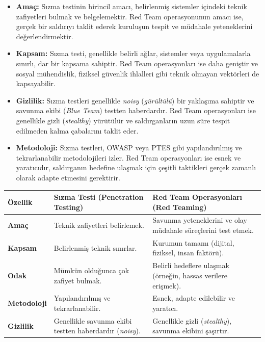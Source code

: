 \begin{itemize}
\item \textbf{Amaç:} Sızma testinin birincil amacı, belirlenmiş sistemler içindeki teknik zafiyetleri bulmak ve belgelemektir. Red Team operasyonunun amacı ise, gerçek bir saldırıyı taklit ederek kuruluşun tespit ve müdahale yeteneklerini değerlendirmektir.
\item \textbf{Kapsam:} Sızma testi, genellikle belirli ağlar, sistemler veya uygulamalarla sınırlı, dar bir kapsama sahiptir. Red Team operasyonları ise daha geniştir ve sosyal mühendislik, fiziksel güvenlik ihlalleri gibi teknik olmayan vektörleri de kapsayabilir.
\item \textbf{Gizlilik:} Sızma testleri genellikle \textit{noisy} (\textit{gürültülü}) bir yaklaşıma sahiptir ve savunma ekibi (\textit{Blue Team}) testten haberdardır. Red Team operasyonları ise genellikle gizli (\textit{stealthy}) yürütülür ve saldırganların uzun süre tespit edilmeden kalma çabalarını taklit eder.
\item \textbf{Metodoloji:} Sızma testleri, OWASP veya PTES gibi yapılandırılmış ve tekrarlanabilir metodolojileri izler. Red Team operasyonları ise esnek ve yaratıcıdır, saldırganın hedefine ulaşmak için çeşitli taktikleri gerçek zamanlı olarak adapte etmesini gerektirir.
\end{itemize}

\begin{center}
\begin{tabularx}{0.95\textwidth}{|>{\raggedright\arraybackslash}X|>{\raggedright\arraybackslash}X|>{\raggedright\arraybackslash}X|}
\hline
\textbf{Özellik} & \textbf{Sızma Testi (Penetration Testing)} & \textbf{Red Team Operasyonları (Red Teaming)} \\
\hline
\textbf{Amaç} & Teknik zafiyetleri belirlemek. & Savunma yeteneklerini ve olay müdahale süreçlerini test etmek. \\
\hline
\textbf{Kapsam} & Belirlenmiş teknik sınırlar. & Kurumun tamamı (dijital, fiziksel, insan faktörü). \\
\hline
\textbf{Odak} & Mümkün olduğunca çok zafiyet bulmak. & Belirli hedeflere ulaşmak (örneğin, hassas verilere erişmek). \\
\hline
\textbf{Metodoloji} & Yapılandırılmış ve tekrarlanabilir. & Esnek, adapte edilebilir ve yaratıcı. \\
\hline
\textbf{Gizlilik} & Genellikle savunma ekibi testten haberdardır (\textit{noisy}). & Genellikle gizli (\textit{stealthy}), savunma ekibini şaşırtır. \\
\hline
\end{tabularx}
\end{center}

